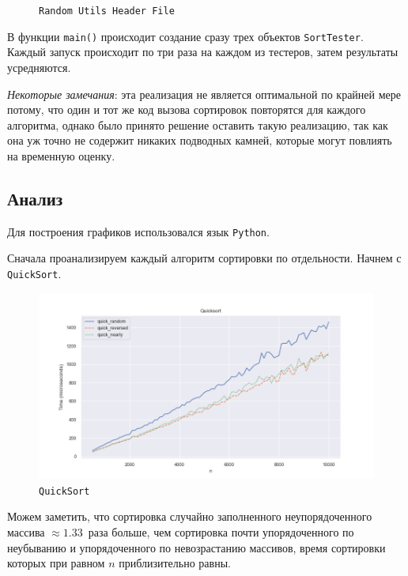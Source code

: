 \documentclass[11pt,a4paper]{scrarticle}
\theoremstyle{definition}
\begin{document}
\begin{figure}[htp]
	\centering
	\inputminted[linenos,fontsize=\small]{cpp}{../analyze/random_utils.h}
	\caption{\texttt{Random Utils Header File}}
	\label{code:random-h}
\end{figure}
\FloatBarrier

В функции \texttt{main()} происходит создание сразу трех объектов \texttt{SortTester}. Каждый запуск происходит по три раза на каждом из тестеров, затем результаты усредняются.

\emph{Некоторые замечания}: эта реализация не является оптимальной по крайней мере потому, что один и тот же код вызова сортировок повторятся для каждого алгоритма, однако было принято решение оставить такую реализацию, так как она уж точно не содержит никаких подводных камней, которые могут повлиять на временную оценку.

\subsection*{Анализ}

Для построения графиков использовался язык \texttt{Python}.

Сначала проанализируем каждый алгоритм сортировки по отдельности. Начнем с \texttt{QuickSort}.

\begin{figure}[htp]
	\centering
	\includegraphics[width=\textwidth]{../static/quick.png}
	\caption{\texttt{QuickSort}}
	\label{fig:quick}
\end{figure}
\FloatBarrier

Можем заметить, что сортировка случайно заполненного неупорядоченного массива $\approx 1.33$~раза больше, чем сортировка почти упорядоченного по неубыванию и упорядоченного по невозрастанию массивов, время сортировки которых при равном $n$ приблизительно равны.
\end{document}
